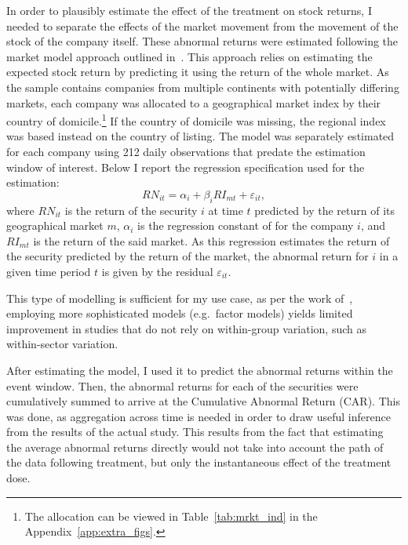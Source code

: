 \documentclass[12pt]{article}
\begin{document}

In order to plausibly estimate the effect of the treatment on stock returns, I needed to separate the effects of the market movement from the movement of the stock of the company itself. These abnormal returns were estimated following the market model approach outlined in~\textcite{mackinlayEventStudiesEconomics1997}. This approach relies on estimating the expected stock return by predicting it using the return of the whole market. As the sample contains companies from multiple continents with potentially differing markets, each company was allocated to a geographical market index by their country of domicile.\footnote{The allocation can be viewed in Table~\ref{tab:mrkt_ind} in the Appendix~\ref{app:extra_figs}.} If the country of domicile was missing, the regional index was based instead on the country of listing. The model was separately estimated for each company using 212 daily observations that predate the estimation window of interest. Below I report the regression specification used for the estimation:
\begin{equation}\label{eq:reg_market_model}
    RN_{it} = \alpha_i + \beta_{i} RI_{mt} + \varepsilon_{it},
\end{equation}
where $RN_{it}$ is the return of the security $i$ at time $t$ predicted by the return of its geographical market $m$, $\alpha_i$ is the regression constant of for the company $i$, and $RI_{mt}$ is the return of the said market. As this regression estimates the return of the security predicted by the return of the market, the abnormal return for $i$ in a given time period $t$ is given by the residual $\varepsilon_{it}$.

This type of modelling is sufficient for my use case, as per the work of~\textcite{mackinlayEventStudiesEconomics1997}, employing more sophisticated models (e.g.~factor models) yields limited improvement in studies that do not rely on within-group variation, such as within-sector variation.

After estimating the model, I used it to predict the abnormal returns within the event window. Then, the abnormal returns for each of the securities were cumulatively summed to arrive at the Cumulative Abnormal Return (CAR). This was done, as aggregation across time is needed in order to draw useful inference from the results of the actual study. This results from the fact that estimating the average abnormal returns directly would not take into account the path of the data following treatment, but only the instantaneous effect of the treatment dose.
\end{document}
